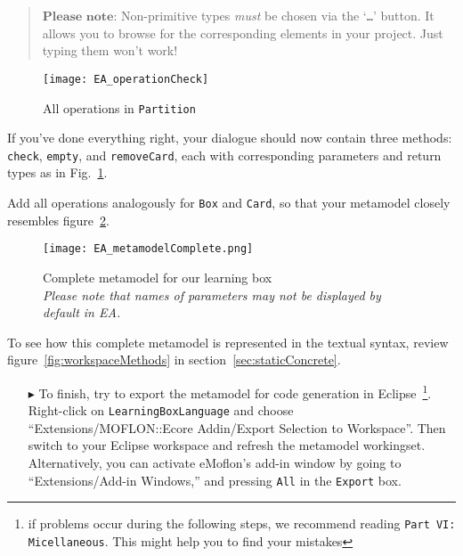 \vspace{-.5cm}
\begin{quote}
$\textbf{Please note:}$ Non-primitive types \emph{must} be chosen via the `\texttt{\ldots}' button. It allows you to browse for the corresponding elements in
your project. Just typing them won't work!
\end{quote}


\begin{figure}[htbp]
	\centering
  \texttt{[image: EA\_operationCheck]}
	\caption{All operations in \texttt{Partition}}
	\label{fig:operation_partition}
\end{figure}

If you've done everything right, your dialogue should now contain three methods: \texttt{check}, \texttt{empty}, and \texttt{removeCard}, each with
corresponding parameters and return types as in Fig.~\ref{fig:operation_partition}.

Add all operations analogously for \texttt{Box} and \texttt{Card}, so that your metamodel closely resembles figure~\ref{fig:metamodel_complete}.

\begin{figure}[htbp]
	\centering
  \texttt{[image: EA\_metamodelComplete.png]}
	\caption[Complete metamodel for our learning box.]{Complete metamodel for our learning box \\ \emph{\small Please note that names of parameters may not be displayed by default in EA.}}
	\label{fig:metamodel_complete}
\end{figure}

\pagebreak

To see how this complete metamodel is represented in the textual syntax, review figure~\ref{fig:workspaceMethods} in section~\ref{sec:staticConcrete}.

\begin{enumerate}
\item[$\blacktriangleright$] To finish, try to export the metamodel for code generation in Eclipse~\footnote{if problems occur during the following steps, we
recommend reading \texttt{Part VI: Micellaneous}. This might help you to find your mistakes}. Right-click on \texttt{LearningBoxLanguage} and choose
``Extensions/MOFLON::Ecore Addin/Export Selection to Workspace''. Then switch to your Eclipse work\-space and refresh the metamodel workingset. Alternatively,
you can activate eMoflon's add-in window by going to ``Extensions/Add-in Windows,'' and pressing \texttt{All} in the \texttt{Export} box.
\end{enumerate}


